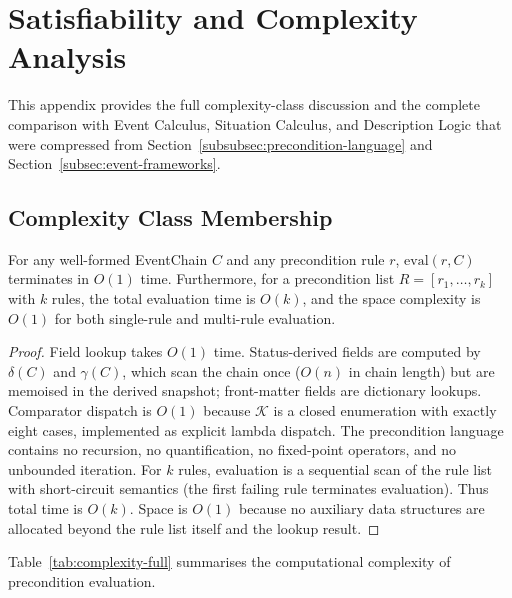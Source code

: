 \section{Satisfiability and Complexity Analysis}\label{app:complexity}

This appendix provides the full complexity-class discussion and the complete comparison with Event Calculus, Situation Calculus, and Description Logic that were compressed from Section~\ref{subsubsec:precondition-language} and Section~\ref{subsec:event-frameworks}.

\subsection{Complexity Class Membership}

\begin{proposition}
\label{prop:precondition-complexity}
For any well-formed EventChain $C$ and any precondition rule $r$, $\text{eval}(r, C)$ terminates in $O(1)$ time. Furthermore, for a precondition list $R = [r_1, \ldots, r_k]$ with $k$ rules, the total evaluation time is $O(k)$, and the space complexity is $O(1)$ for both single-rule and multi-rule evaluation.
\end{proposition}

\begin{proof}
Field lookup takes $O(1)$ time. Status-derived fields are computed by $\delta(C)$ and $\gamma(C)$, which scan the chain once ($O(n)$ in chain length) but are memoised in the derived snapshot; front-matter fields are dictionary lookups. Comparator dispatch is $O(1)$ because $\mathcal{K}$ is a closed enumeration with exactly eight cases, implemented as explicit lambda dispatch. The precondition language contains no recursion, no quantification, no fixed-point operators, and no unbounded iteration. For $k$ rules, evaluation is a sequential scan of the rule list with short-circuit semantics (the first failing rule terminates evaluation). Thus total time is $O(k)$. Space is $O(1)$ because no auxiliary data structures are allocated beyond the rule list itself and the lookup result.
\end{proof}

Table~\ref{tab:complexity-full} summarises the computational complexity of precondition evaluation.

